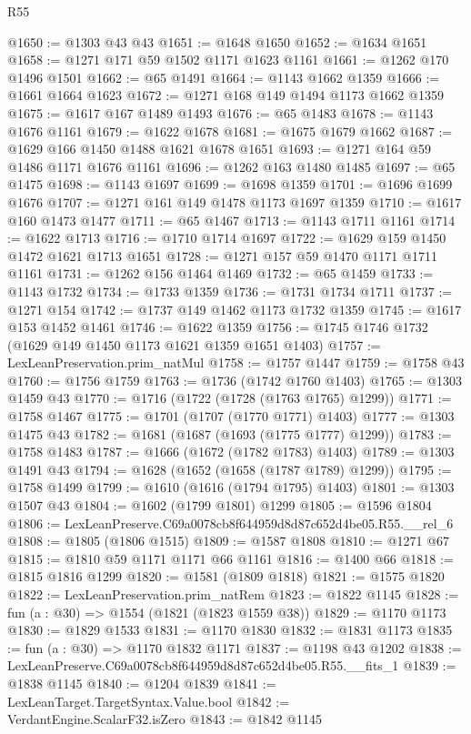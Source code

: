 \begin{lexlean}{R55}
\begin{coremodule}
@1650 := @1303 @43 @43
@1651 := @1648 @1650
@1652 := @1634 @1651
@1658 := @1271 @171 @59 @1502 @1171 @1623 @1161
@1661 := @1262 @170 @1496 @1501
@1662 := @65 @1491
@1664 := @1143 @1662 @1359
@1666 := @1661 @1664 @1623
@1672 := @1271 @168 @149 @1494 @1173 @1662 @1359
@1675 := @1617 @167 @1489 @1493
@1676 := @65 @1483
@1678 := @1143 @1676 @1161
@1679 := @1622 @1678
@1681 := @1675 @1679 @1662
@1687 := @1629 @166 @1450 @1488 @1621 @1678 @1651
@1693 := @1271 @164 @59 @1486 @1171 @1676 @1161
@1696 := @1262 @163 @1480 @1485
@1697 := @65 @1475
@1698 := @1143 @1697
@1699 := @1698 @1359
@1701 := @1696 @1699 @1676
@1707 := @1271 @161 @149 @1478 @1173 @1697 @1359
@1710 := @1617 @160 @1473 @1477
@1711 := @65 @1467
@1713 := @1143 @1711 @1161
@1714 := @1622 @1713
@1716 := @1710 @1714 @1697
@1722 := @1629 @159 @1450 @1472 @1621 @1713 @1651
@1728 := @1271 @157 @59 @1470 @1171 @1711 @1161
@1731 := @1262 @156 @1464 @1469
@1732 := @65 @1459
@1733 := @1143 @1732
@1734 := @1733 @1359
@1736 := @1731 @1734 @1711
@1737 := @1271 @154
@1742 := @1737 @149 @1462 @1173 @1732 @1359
@1745 := @1617 @153 @1452 @1461
@1746 := @1622 @1359
@1756 := @1745 @1746 @1732 (@1629 @149 @1450 @1173 @1621 @1359 @1651 @1403)
@1757 := LexLeanPreservation.prim_natMul
@1758 := @1757 @1447
@1759 := @1758 @43
@1760 := @1756 @1759
@1763 := @1736 (@1742 @1760 @1403)
@1765 := @1303 @1459 @43
@1770 := @1716 (@1722 (@1728 (@1763 @1765) @1299))
@1771 := @1758 @1467
@1775 := @1701 (@1707 (@1770 @1771) @1403)
@1777 := @1303 @1475 @43
@1782 := @1681 (@1687 (@1693 (@1775 @1777) @1299))
@1783 := @1758 @1483
@1787 := @1666 (@1672 (@1782 @1783) @1403)
@1789 := @1303 @1491 @43
@1794 := @1628 (@1652 (@1658 (@1787 @1789) @1299))
@1795 := @1758 @1499
@1799 := @1610 (@1616 (@1794 @1795) @1403)
@1801 := @1303 @1507 @43
@1804 := @1602 (@1799 @1801) @1299
@1805 := @1596 @1804
@1806 := LexLeanPreserve.C69a0078cb8f644959d8d87c652d4be05.R55.__rel_6
@1808 := @1805 (@1806 @1515)
@1809 := @1587 @1808
@1810 := @1271 @67
@1815 := @1810 @59 @1171 @1171 @66 @1161
@1816 := @1400 @66
@1818 := @1815 @1816 @1299
@1820 := @1581 (@1809 @1818)
@1821 := @1575 @1820
@1822 := LexLeanPreservation.prim_natRem
@1823 := @1822 @1145
@1828 := fun (a : @30) => @1554 (@1821 (@1823 @1559 @38))
@1829 := @1170 @1173
@1830 := @1829 @1533
@1831 := @1170 @1830
@1832 := @1831 @1173
@1835 := fun (a : @30) => @1170 @1832 @1171
@1837 := @1198 @43 @1202
@1838 := LexLeanPreserve.C69a0078cb8f644959d8d87c652d4be05.R55.__fits_1
@1839 := @1838 @1145
@1840 := @1204 @1839
@1841 := LexLeanTarget.TargetSyntax.Value.bool
@1842 := VerdantEngine.ScalarF32.isZero
@1843 := @1842 @1145

\end{coremodule}
\end{lexlean}
